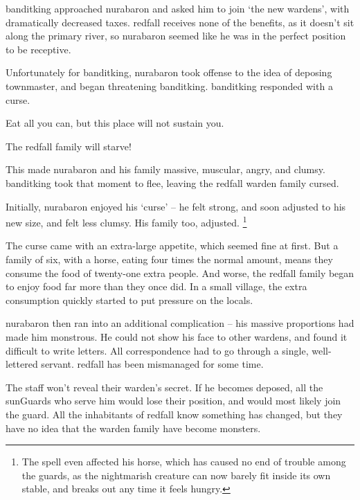 \label{desperatemeasures}


\begin{exampletext}
  \noindent
  \Gls{banditking} approached \gls{nurabaron} and asked him to join `the new \glspl{warden}', with dramatically decreased taxes.
  \Gls{redfall} receives none of the benefits, as it doesn't sit along the primary river, so \gls{nurabaron} seemed like he was in the perfect position to be receptive.

  Unfortunately for \gls{banditking}, \gls{nurabaron} took offense to the idea of deposing \gls{townmaster}, and began threatening \gls{banditking}.
  \Gls{banditking} responded with a curse.

  \begin{speechtext}
    Eat all you can, but this place will not sustain you.

    The \gls{redfall} family will starve!

  \end{speechtext}

  This  made \gls{nurabaron} and his family massive, muscular, angry, and clumsy.
  \Gls{banditking} took that moment to flee, leaving the \gls{redfall} \gls{warden} family cursed.

  Initially, \gls{nurabaron} enjoyed his `curse' -- he felt strong, and soon adjusted to his new size, and felt less clumsy.
  His family too, adjusted.%
  \footnote{The spell even affected his horse, which has caused no end of trouble among the guards, as the nightmarish creature can now barely fit inside its own stable, and breaks out any time it feels hungry.}

  \null
  The curse came with an extra-large appetite, which seemed fine at first.
  But a family of six, with a horse, eating four times the normal amount, means they consume the food of twenty-one extra people.
  And worse, the \gls{redfall} family began to enjoy food far more than they once did.
  In a small \gls{village}, the extra consumption quickly started to put pressure on the locals.

  \Gls{nurabaron} then ran into an additional complication -- his massive proportions had made him monstrous.
  He could not show his face to other \glspl{warden}, and found it difficult to write letters.
  All correspondence had to go through a single, well-lettered servant.
  \Gls{redfall} has been mismanaged for some time.

  The staff won't reveal their \gls{warden}'s secret.
  If he becomes deposed, all the \glspl{sunGuard} who serve him would lose their position, and would most likely join the \gls{guard}.
  All the inhabitants of \gls{redfall} know something has changed, but they have no idea that the \gls{warden} family have become monsters.
\end{exampletext}

